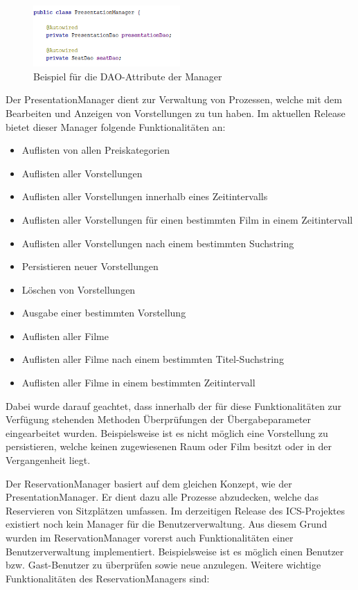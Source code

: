 \begin{figure}[H]
	\centering 
	\includegraphics[width=0.5\textwidth]{img/manager_dao}
	\captionsetup{format=hang}
	\caption[Beispiel für die \ac{DAO}-Attribute der Manager]{\label{fig:manager_dao}Beispiel für die \ac{DAO}-Attribute der Manager}
\end{figure}	


Der PresentationManager dient zur Verwaltung von Prozessen, welche mit dem Bearbeiten und Anzeigen von Vorstellungen zu tun haben. Im aktuellen Release bietet dieser Manager folgende Funktionalitäten an:

\begin{itemize}
	\setlength\itemsep{-0.5em}
	\item Auflisten von allen Preiskategorien
	\item Auflisten aller Vorstellungen
	\item Auflisten aller Vorstellungen innerhalb eines Zeitintervalls
	\item Auflisten aller Vorstellungen für einen bestimmten Film in einem Zeitintervall
	\item Auflisten aller Vorstellungen nach einem bestimmten Suchstring
	\item Persistieren neuer Vorstellungen
	\item Löschen von Vorstellungen
	\item Ausgabe einer bestimmten Vorstellung
	\item Auflisten aller Filme
	\item Auflisten aller Filme nach einem bestimmten Titel-Suchstring
	\item Auflisten aller Filme in einem bestimmten Zeitintervall
\end{itemize}

Dabei wurde darauf geachtet, dass innerhalb der für diese Funktionalitäten zur Verfügung stehenden Methoden Überprüfungen der Übergabeparameter eingearbeitet wurden. Beispielsweise ist es nicht möglich eine Vorstellung zu persistieren, welche keinen zugewiesenen Raum oder Film besitzt oder in der Vergangenheit liegt.

Der ReservationManager basiert auf dem gleichen Konzept, wie der PresentationManager. Er dient dazu alle Prozesse abzudecken, welche das Reservieren von Sitzplätzen umfassen. Im derzeitigen Release des \ac{ICS}-Projektes existiert noch kein Manager für die Benutzerverwaltung. Aus diesem Grund wurden im ReservationManager vorerst auch Funktionalitäten einer Benutzerverwaltung implementiert. Beispielsweise ist es möglich einen Benutzer bzw. Gast-Benutzer zu überprüfen sowie neue anzulegen. Weitere wichtige Funktionalitäten des ReservationManagers sind: 

